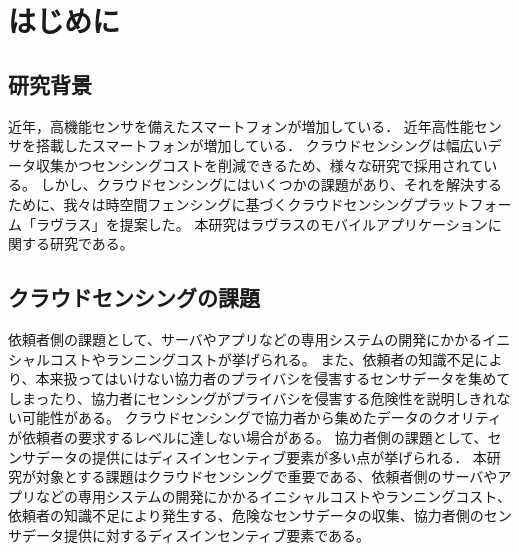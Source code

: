 \chapter{はじめに}
\thispagestyle{myheadings}


\section{研究背景}
\label{sec:schedule}

近年，高機能センサを備えたスマートフォンが増加している．
近年高性能センサを搭載したスマートフォンが増加している．
クラウドセンシングは幅広いデータ収集かつセンシングコストを削減できるため、様々な研究で採用されている。
しかし、クラウドセンシングにはいくつかの課題があり、それを解決するために、我々は時空間フェンシングに基づくクラウドセンシングプラットフォーム「ラヴラス」を提案した。
本研究はラヴラスのモバイルアプリケーションに関する研究である。

\section{クラウドセンシングの課題}
依頼者側の課題として、サーバやアプリなどの専用システムの開発にかかるイニシャルコストやランニングコストが挙げられる。
また、依頼者の知識不足により、本来扱ってはいけない協力者のプライバシを侵害するセンサデータを集めてしまったり、協力者にセンシングがプライバシを侵害する危険性を説明しきれない可能性がある。
クラウドセンシングで協力者から集めたデータのクオリティが依頼者の要求するレベルに達しない場合がある。
協力者側の課題として、センサデータの提供にはディスインセンティブ要素が多い点が挙げられる．
本研究が対象とする課題はクラウドセンシングで重要である、依頼者側のサーバやアプリなどの専用システムの開発にかかるイニシャルコストやランニングコスト、依頼者の知識不足により発生する、危険なセンサデータの収集、協力者側のセンサデータ提供に対するディスインセンティブ要素である。

